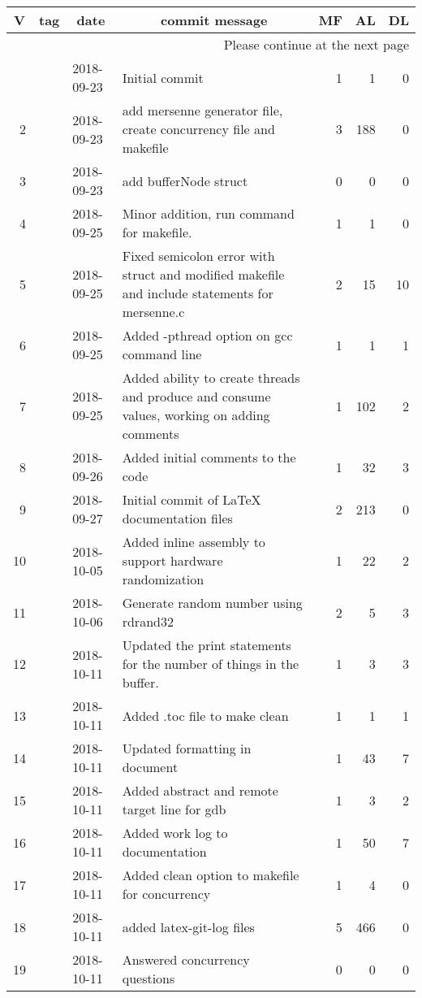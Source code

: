 \documentclass[10pt,a4paper,english]{article}
\newcommand{\longtableendfoot}{Please continue at the next page}
\begin{document}
\begin{longtable}{|rllp{10cm}rrr|}
\hline \multicolumn{1}{|c}{\textbf{V}} & \multicolumn{1}{c}{\textbf{tag}}
& \multicolumn{1}{c}{\textbf{date}}
& \multicolumn{1}{c}{\textbf{commit message}} & \multicolumn{1}{c}{\textbf{MF}}
& \multicolumn{1}{c}{\textbf{AL}} & \multicolumn{1}{c|}{\textbf{DL}} \\ \hline
\endhead

\hline \multicolumn{7}{|r|}{\longtableendfoot} \\ \hline
\endfoot

\hline%
\endlastfoot

\hline 1 &  & 2018-09-23 & Initial commit & 1 & 1 & 0 \\
\hline 2 &  & 2018-09-23 & add mersenne generator file, create concurrency file and makefile & 3 & 188 & 0 \\
\hline 3 &  & 2018-09-23 & add bufferNode struct & 0 & 0 & 0 \\
\hline 4 &  & 2018-09-25 & Minor addition, run command for makefile. & 1 & 1 & 0 \\
\hline 5 &  & 2018-09-25 & Fixed semicolon error with struct and modified makefile and include statements for mersenne.c & 2 & 15 & 10 \\
\hline 6 &  & 2018-09-25 & Added -pthread option on gcc command line & 1 & 1 & 1 \\
\hline 7 &  & 2018-09-25 & Added ability to create threads and produce and consume values, working on adding comments & 1 & 102 & 2 \\
\hline 8 &  & 2018-09-26 & Added initial comments to the code & 1 & 32 & 3 \\
\hline 9 &  & 2018-09-27 & Initial commit of LaTeX documentation files & 2 & 213 & 0 \\
\hline 10 &  & 2018-10-05 & Added inline assembly to support hardware randomization & 1 & 22 & 2 \\
\hline 11 &  & 2018-10-06 & Generate random number using rdrand32 & 2 & 5 & 3 \\
\hline 12 &  & 2018-10-11 & Updated the print statements for the number of things in the buffer. & 1 & 3 & 3 \\
\hline 13 &  & 2018-10-11 & Added .toc file to make clean & 1 & 1 & 1 \\
\hline 14 &  & 2018-10-11 & Updated formatting in document & 1 & 43 & 7 \\
\hline 15 &  & 2018-10-11 & Added abstract and remote target line for gdb & 1 & 3 & 2 \\
\hline 16 &  & 2018-10-11 & Added work log to documentation & 1 & 50 & 7 \\
\hline 17 &  & 2018-10-11 & Added clean option to makefile for concurrency & 1 & 4 & 0 \\
\hline 18 &  & 2018-10-11 & added latex-git-log files & 5 & 466 & 0 \\
\hline 19 &  & 2018-10-11 & Answered concurrency questions & 0 & 0 & 0 \\
\end{longtable}
\end{document}
